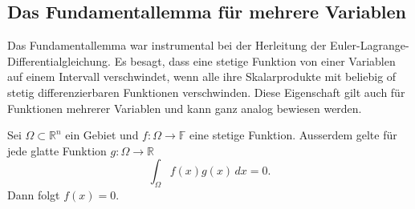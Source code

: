 %
%
%

%
%
\subsection{Das Fundamentallemma für mehrere Variablen}
Das Fundamentallemma war instrumental bei der Herleitung der
Euler-Lagrange-Dif\-fe\-ren\-tial\-glei\-chung.
Es besagt, dass eine stetige Funktion von einer Variablen auf einem Intervall
verschwindet, wenn alle ihre Skalarprodukte mit beliebig of stetig
differenzierbaren Funktionen verschwinden.
Diese Eigenschaft gilt auch für Funktionen mehrerer Variablen und kann
ganz analog bewiesen werden.

\begin{satz}[Fundamentallemma]
Sei $\Omega\subset\mathbb{R}^n$ ein Gebiet und $f\colon \Omega\to\mathbb{F}$
eine stetige Funktion.
Ausserdem gelte für jede glatte Funktion $g\colon\Omega\to\mathbb{R}$ 
\begin{equation}
\int_{\Omega} f(x)g(x)\,dx = 0.
\label{buch:felder:fundamentallemma:eqn:bedfundamentallemma}
\end{equation}
Dann folgt $f(x)=0$.
\end{satz}


